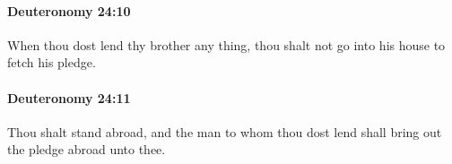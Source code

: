 		\paragraph{Deuteronomy 24:10} %
			\label{DEUTERONOMY-24-10}

			When thou dost lend thy brother any thing, thou shalt not go into his house to fetch his pledge.


		\paragraph{Deuteronomy 24:11} %
			\label{DEUTERONOMY-24-11}

			Thou shalt stand abroad, and the man to whom thou dost lend shall bring out the pledge abroad unto thee.


